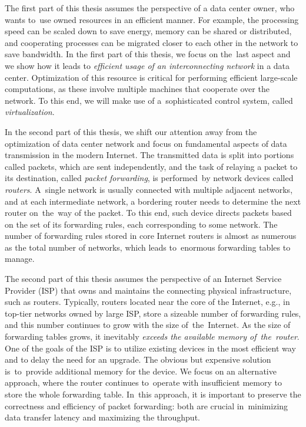 \medskip
The first part of this thesis assumes the perspective of a data center owner, who wants to~use owned resources in an efficient manner.
For example, the processing speed can be scaled down to save energy, memory can be shared or distributed, and cooperating processes can be migrated closer to each other in the network to save bandwidth.
In the first part of this thesis, we focus on the~last aspect and we show how it leads to
\emph{efficient usage of an interconnecting network} in a data center.
Optimization of this resource is critical for performing efficient large-scale computations, as these involve multiple machines that cooperate over the network.
To this end, we will make use of a~sophisticated control system, called \emph{virtualization}.

\medskip

In the second part of this thesis, we shift our attention away from the optimization of data center network and focus on fundamental aspects of data transmission in the modern Internet.
The transmitted data is split into portions called packets, which are sent independently, and the task of relaying a packet to its destination, called \emph{packet forwarding}, is performed~by network devices called \emph{routers}.
A~single network is usually connected with multiple adjacent networks, and at each intermediate network, a bordering router needs to determine the next router on~the~way of the packet.
To this end, such device directs packets based on the set of its forwarding rules, each corresponding to some network.
The number of forwarding rules stored in core Internet routers is almost as numerous as the total number of networks, which leads to~enormous forwarding tables to manage.

The second part of this thesis assumes the perspective of an Internet Service Provider (ISP) that owns and maintains the connecting physical infrastructure, such as routers.
Typically, routers located near the core of the Internet, e.g., in top-tier networks owned by large ISP, store a sizeable number of forwarding rules, and this number continues to grow with the size of~the~Internet.
As the size of forwarding tables grows, it inevitably \emph{exceeds the available memory of~the~router}.
One of the goals of the ISP is to utilize existing devices in the most efficient way and to delay the need for an upgrade.
The obvious but expensive solution is~to~provide additional memory for the device.
We focus on an alternative approach, where the router continues to~operate with insufficient memory to store the whole forwarding table.
In~this approach, it is important to preserve the correctness and efficiency of packet forwarding: both are crucial in~minimizing data transfer latency and maximizing the throughput.


